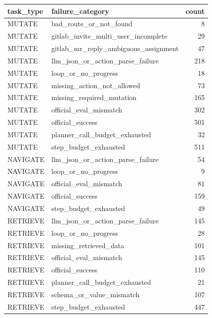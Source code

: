 \begin{tabular}{llr}
\toprule
task_type & failure_category & count \\
\midrule
MUTATE & bad_route_or_not_found & 8 \\
MUTATE & gitlab_invite_multi_user_incomplete & 29 \\
MUTATE & gitlab_mr_reply_ambiguous_assignment & 47 \\
MUTATE & llm_json_or_action_parse_failure & 218 \\
MUTATE & loop_or_no_progress & 18 \\
MUTATE & missing_action_not_allowed & 73 \\
MUTATE & missing_required_mutation & 165 \\
MUTATE & official_eval_mismatch & 302 \\
MUTATE & official_success & 501 \\
MUTATE & planner_call_budget_exhausted & 32 \\
MUTATE & step_budget_exhausted & 511 \\
NAVIGATE & llm_json_or_action_parse_failure & 54 \\
NAVIGATE & loop_or_no_progress & 9 \\
NAVIGATE & official_eval_mismatch & 81 \\
NAVIGATE & official_success & 159 \\
NAVIGATE & step_budget_exhausted & 49 \\
RETRIEVE & llm_json_or_action_parse_failure & 145 \\
RETRIEVE & loop_or_no_progress & 28 \\
RETRIEVE & missing_retrieved_data & 101 \\
RETRIEVE & official_eval_mismatch & 145 \\
RETRIEVE & official_success & 110 \\
RETRIEVE & planner_call_budget_exhausted & 21 \\
RETRIEVE & schema_or_value_mismatch & 107 \\
RETRIEVE & step_budget_exhausted & 447 \\
\bottomrule
\end{tabular}
